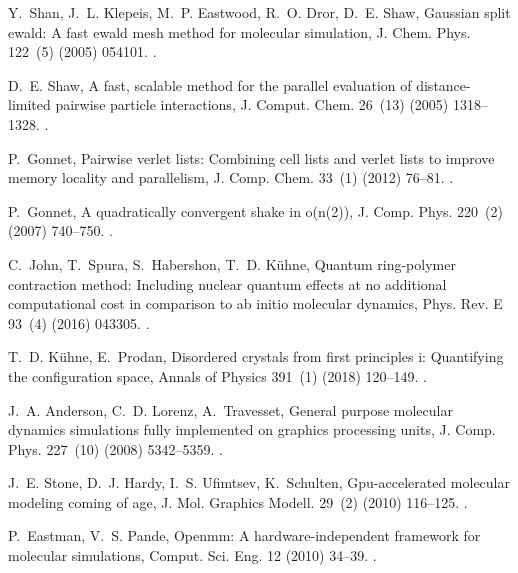 \documentclass[preprint]{elsarticle}
\begin{document}
\begin{thebibliography}{10}
Y.~Shan, J.~L. Klepeis, M.~P. Eastwood, R.~O. Dror, D.~E. Shaw, Gaussian split
  ewald: A fast ewald mesh method for molecular simulation, J. Chem. Phys.
  122~(5) (2005) 054101.
\newblock \href {https://doi.org/10.1063/1.1839571}
  {}.

D.~E. Shaw, A fast, scalable method for the parallel evaluation of
  distance-limited pairwise particle interactions, J. Comput. Chem. 26~(13)
  (2005) 1318--1328.
\newblock \href {https://doi.org/10.1002/jcc.20267}
  {}.

P.~Gonnet, Pairwise verlet lists: Combining cell lists and verlet lists to
  improve memory locality and parallelism, J. Comp. Chem. 33~(1) (2012) 76--81.
\newblock \href {https://doi.org/10.1002/jcc.21945}
  {}.

P.~Gonnet, A quadratically convergent shake in o(n(2)), J. Comp. Phys. 220~(2)
  (2007) 740--750.
\newblock \href {https://doi.org/10.1016/j.jcp.2006.05.032}
  {}.

C.~John, T.~Spura, S.~Habershon, T.~D. K\"uhne, Quantum ring-polymer
  contraction method: Including nuclear quantum effects at no additional
  computational cost in comparison to ab initio molecular dynamics, Phys. Rev.
  E 93~(4) (2016) 043305.
\newblock \href {https://doi.org/10.1103/PhysRevE.93.043305}
  {}.

T.~D. K\"uhne, E.~Prodan, Disordered crystals from first principles i:
  Quantifying the configuration space, Annals of Physics 391~(1) (2018)
  120--149.
\newblock \href {https://doi.org/10.1016/j.aop.2018.01.016}
  {}.

J.~A. Anderson, C.~D. Lorenz, A.~Travesset, General purpose molecular dynamics
  simulations fully implemented on graphics processing units, J. Comp. Phys.
  227~(10) (2008) 5342--5359.
\newblock \href {https://doi.org/10.1016/j.jcp.2008.01.047}
  {}.

J.~E. Stone, D.~J. Hardy, I.~S. Ufimtsev, K.~Schulten, Gpu-accelerated
  molecular modeling coming of age, J. Mol. Graphics Modell. 29~(2) (2010)
  116--125.
\newblock \href {https://doi.org/10.1016/j.jmgm.2010.06.010}
  {}.

P.~Eastman, V.~S. Pande, Openmm: A hardware-independent framework for molecular
  simulations, Comput. Sci. Eng. 12 (2010) 34--39.
\newblock \href {https://doi.org/10.1109/MCSE.2010.27}
  {}.


\end{thebibliography}
\end{document}

